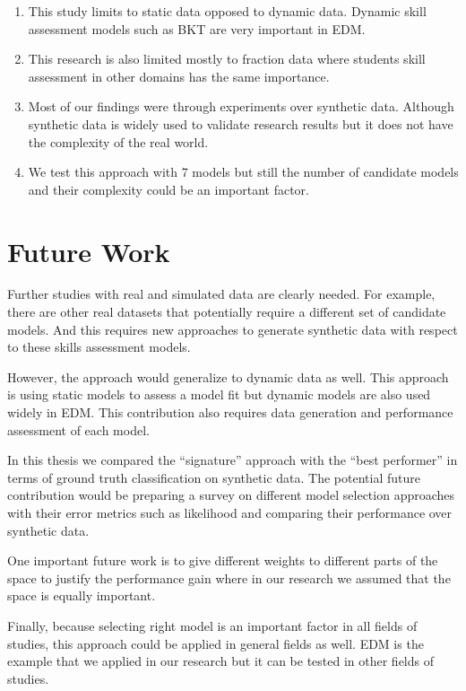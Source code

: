 
  \begin{enumerate}
  \item This study limits to static data opposed to dynamic data. Dynamic skill assessment models such as BKT are very important in EDM.  
  \item This research is also limited mostly to fraction data where students skill assessment in other domains has the same importance.%
  \item Most of our findings were through experiments over synthetic data. Although synthetic data is widely used to validate research results but it does not have the complexity of the real world.%
  \item We test this approach with 7 models but still the number of candidate models and their complexity could be an important factor. %
  \end{enumerate}

\section{Future Work}

Further studies with real and simulated data are clearly needed.  For example, there are other real datasets that potentially require a different set of candidate models. And this requires new approaches to generate synthetic data with respect to these skills assessment models.

However, the approach would generalize to dynamic data as well. This approach is using static models to assess a model fit but dynamic models are also used widely in EDM. This contribution also requires data generation and performance assessment of each model.

In this thesis we compared the ``signature'' approach with the ``best performer'' in terms of ground truth classification on synthetic data. The potential future contribution would be preparing a survey on different model selection approaches with their error metrics such as likelihood and comparing their performance over synthetic data.

One important future work is to give different weights to different parts of the space to justify the performance gain where in our research we assumed that the space is equally important.

Finally, because selecting right model is an important factor in all fields of studies, this approach could be applied in general fields as well. EDM is the example that we applied in our research but it can be tested in other fields of studies.
